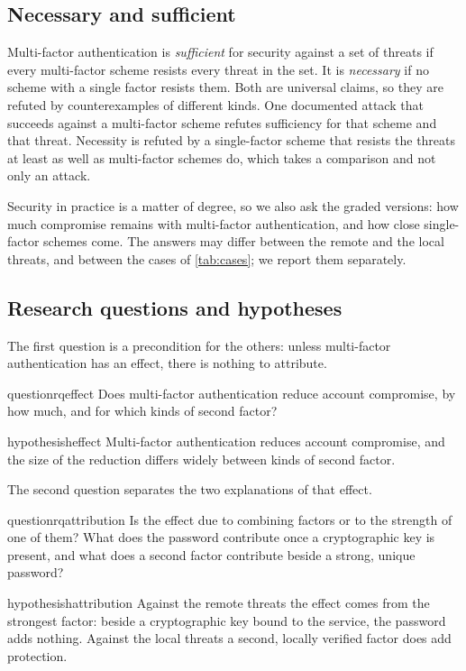 \subsection{Necessary and sufficient}\label{sec:logic}

Multi-factor authentication is \emph{sufficient} for security against a
set of threats if every multi-factor scheme resists every threat in the
set.
It is \emph{necessary} if no scheme with a single factor resists them.
Both are universal claims, so they are refuted by counterexamples of
different kinds.
One documented attack that succeeds against a multi-factor scheme refutes
sufficiency for that scheme and that threat.
Necessity is refuted by a single-factor scheme that resists the threats
at least as well as multi-factor schemes do, which takes a comparison and
not only an attack.

Security in practice is a matter of degree, so we also ask the graded
versions: how much compromise remains with multi-factor authentication,
and how close single-factor schemes come.
The answers may differ between the remote and the local threats, and
between the cases of \cref{tab:cases}; we report them separately.

\subsection{Research questions and hypotheses}\label{sec:questions}

The first question is a precondition for the others: unless multi-factor
authentication has an effect, there is nothing to attribute.
\begin{restatable}{question}{rqeffect}\label{rq:effect}
  Does multi-factor authentication reduce account compromise, by how
  much, and for which kinds of second factor?
\end{restatable}
\begin{restatable}{hypothesis}{heffect}\label{h:effect}
  Multi-factor authentication reduces account compromise, and the size
  of the reduction differs widely between kinds of second factor.
\end{restatable}

The second question separates the two explanations of that effect.
\begin{restatable}{question}{rqattribution}\label{rq:attribution}
  Is the effect due to combining factors or to the strength of one of
  them?
  What does the password contribute once a cryptographic key is present,
  and what does a second factor contribute beside a strong, unique
  password?
\end{restatable}
\begin{restatable}{hypothesis}{hattribution}\label{h:attribution}
  Against the remote threats the effect comes from the strongest factor:
  beside a cryptographic key bound to the service, the password adds
  nothing.
  Against the local threats a second, locally verified factor does add
  protection.
\end{restatable}

